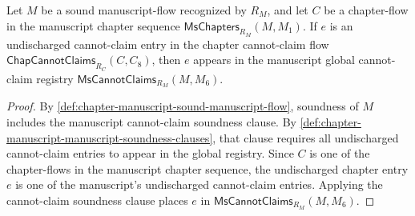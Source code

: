 \begin{theorem}
\label{thm:chapter-manuscript-global-cannot-claim-coverage}
Let $M$ be a sound manuscript-flow recognized by $R_M$, and let $C$ be a chapter-flow in the manuscript chapter sequence $\mathsf{MsChapters}_{R_M}(M,M_1)$. If $e$ is an undischarged cannot-claim entry in the chapter cannot-claim flow $\mathsf{ChapCannotClaims}_{R_C}(C,C_8)$, then $e$ appears in the manuscript global cannot-claim registry $\mathsf{MsCannotClaims}_{R_M}(M,M_6)$.
\end{theorem}

\begin{proof}
By \autoref{def:chapter-manuscript-sound-manuscript-flow}, soundness of $M$ includes the manuscript cannot-claim soundness clause. By \autoref{def:chapter-manuscript-manuscript-soundness-clauses}, that clause requires all undischarged cannot-claim entries to appear in the global registry. Since $C$ is one of the chapter-flows in the manuscript chapter sequence, the undischarged chapter entry $e$ is one of the manuscript's undischarged cannot-claim entries. Applying the cannot-claim soundness clause places $e$ in $\mathsf{MsCannotClaims}_{R_M}(M,M_6)$.
\end{proof}
